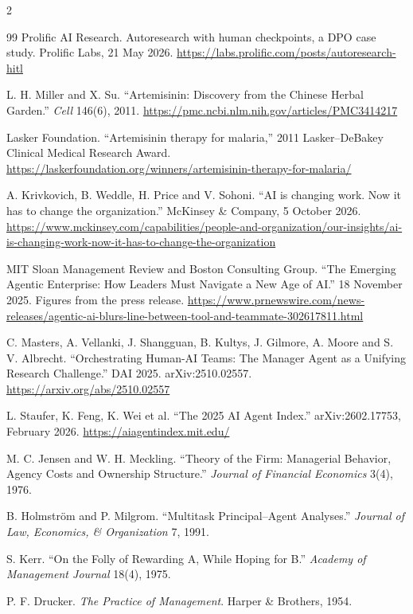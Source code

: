 \documentclass[11pt,letterpaper]{article}
\begin{document}
\begin{multicols}{2}
{\begin{thebibliography}{99}
 Prolific AI Research. Autoresearch with human checkpoints, a DPO case study.
Prolific Labs, 21 May 2026. \url{https://labs.prolific.com/posts/autoresearch-hitl}

 L. H. Miller and X. Su. ``Artemisinin: Discovery from the Chinese Herbal
Garden.'' \emph{Cell} 146(6), 2011. \url{https://pmc.ncbi.nlm.nih.gov/articles/PMC3414217}

 Lasker Foundation. ``Artemisinin therapy for malaria,'' 2011 Lasker--DeBakey
Clinical Medical Research Award.
\url{https://laskerfoundation.org/winners/artemisinin-therapy-for-malaria/}

 A. Krivkovich, B. Weddle, H. Price and V. Sohoni. ``AI is changing
work. Now it has to change the organization.'' McKinsey \& Company, 5 October 2026.
\url{https://www.mckinsey.com/capabilities/people-and-organization/our-insights/ai-is-changing-work-now-it-has-to-change-the-organization}

 MIT Sloan Management Review and Boston Consulting Group. ``The Emerging
Agentic Enterprise: How Leaders Must Navigate a New Age of AI.'' 18 November 2025. Figures
from the press release.
\url{https://www.prnewswire.com/news-releases/agentic-ai-blurs-line-between-tool-and-teammate-302617811.html}

 C. Masters, A. Vellanki, J. Shangguan, B. Kultys, J. Gilmore, A. Moore and
S. V. Albrecht. ``Orchestrating Human-AI Teams: The Manager Agent as a Unifying Research
Challenge.'' DAI 2025. arXiv:2510.02557.
\url{https://arxiv.org/abs/2510.02557}

 L. Staufer, K. Feng, K. Wei et al. ``The 2025 AI Agent Index.''
arXiv:2602.17753, February 2026.
\url{https://aiagentindex.mit.edu/}

 M. C. Jensen and W. H. Meckling. ``Theory of the Firm: Managerial
Behavior, Agency Costs and Ownership Structure.'' \emph{Journal of Financial Economics}
3(4), 1976.

 B. Holmström and P. Milgrom. ``Multitask Principal--Agent Analyses.''
\emph{Journal of Law, Economics, \& Organization} 7, 1991.

 S. Kerr. ``On the Folly of Rewarding A, While Hoping for B.'' \emph{Academy
of Management Journal} 18(4), 1975.

 P. F. Drucker. \emph{The Practice of Management}. Harper \& Brothers, 1954.


\end{thebibliography}}
\end{multicols}
\end{document}
